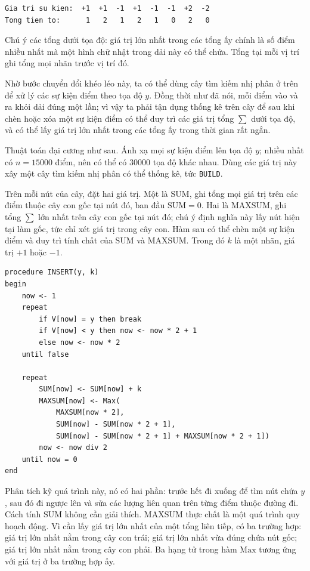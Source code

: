 \documentclass[11pt]{article}
\begin{document}
\begin{verbatim}
Gia tri su kien:  +1  +1  -1  +1  -1  -1  +2  -2
Tong tien to:      1   2   1   2   1   0   2   0
\end{verbatim}

Chú ý các tổng dưới tọa độ: giá trị lớn nhất trong các tổng ấy chính là số
điểm nhiều nhất mà một hình chữ nhật trong dải này có thể chứa. Tổng tại mỗi
vị trí ghi tổng mọi nhãn trước vị trí đó.

Nhờ bước chuyển đổi khéo léo này, ta có thể dùng cây tìm kiếm nhị phân ở trên
để xử lý các sự kiện điểm theo tọa độ \(y\). Đồng thời như đã nói, mỗi điểm
vào và ra khỏi dải đúng một lần; vì vậy ta phải tận dụng thống kê trên cây để
sau khi chèn hoặc xóa một sự kiện điểm có thể duy trì các giá trị tổng
\(\sum\) dưới tọa độ, và có thể lấy giá trị lớn nhất trong các tổng ấy trong
thời gian rất ngắn.

Thuật toán đại cương như sau. Ánh xạ mọi sự kiện điểm lên tọa độ \(y\); nhiều
nhất có \(n=15000\) điểm, nên có thể có \(30000\) tọa độ khác nhau. Dùng các
giá trị này xây một cây tìm kiếm nhị phân có thể thống kê, tức \texttt{BUILD}.

Trên mỗi nút của cây, đặt hai giá trị. Một là \(\mathrm{SUM}\), ghi tổng mọi
giá trị trên các điểm thuộc cây con gốc tại nút đó, ban đầu
\(\mathrm{SUM}=0\). Hai là \(\mathrm{MAXSUM}\), ghi tổng \(\sum\) lớn nhất
trên cây con gốc tại nút đó; chú ý định nghĩa này lấy nút hiện tại làm gốc,
tức chỉ xét giá trị trong cây con. Hàm sau có thể chèn một sự kiện điểm và
duy trì tính chất của \(\mathrm{SUM}\) và \(\mathrm{MAXSUM}\). Trong đó \(k\)
là một nhãn, giá trị \(+1\) hoặc \(-1\).

\begin{verbatim}
procedure INSERT(y, k)
begin
    now <- 1
    repeat
        if V[now] = y then break
        if V[now] < y then now <- now * 2 + 1
        else now <- now * 2
    until false

    repeat
        SUM[now] <- SUM[now] + k
        MAXSUM[now] <- Max(
            MAXSUM[now * 2],
            SUM[now] - SUM[now * 2 + 1],
            SUM[now] - SUM[now * 2 + 1] + MAXSUM[now * 2 + 1])
        now <- now div 2
    until now = 0
end
\end{verbatim}

Phân tích kỹ quá trình này, nó có hai phần: trước hết đi xuống để tìm nút chứa
\(y\), sau đó đi ngược lên và sửa các lượng liên quan trên từng điểm thuộc
đường đi. Cách tính \(\mathrm{SUM}\) không cần giải thích.
\(\mathrm{MAXSUM}\) thực chất là một quá trình quy hoạch động. Vì cần lấy giá
trị lớn nhất của một tổng liên tiếp, có ba trường hợp: giá trị lớn nhất nằm
trong cây con trái; giá trị lớn nhất vừa đúng chứa nút gốc; giá trị lớn nhất
nằm trong cây con phải. Ba hạng tử trong hàm \(\mathrm{Max}\) tương ứng với
giá trị ở ba trường hợp ấy.
\end{document}

